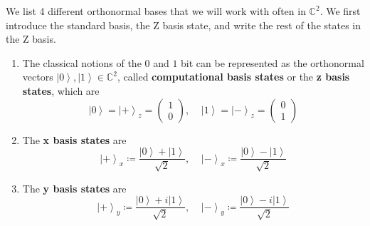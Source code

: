 \documentclass{article}
\newcommand{\ket}[1]{\ensuremath{\left|#1\right\rangle}}
\newcounter{definition}[section]
\begin{document}
    \begin{definition}
      \label{def:basis-states}
      We list 4 different orthonormal bases that we will work with often in $\mathbb{C}^2$. We first introduce the standard basis, the Z basis state, and write the rest of the states in the Z basis. 

      \begin{enumerate}
        \item The classical notions of the $0$ and $1$ bit can be represented as the orthonormal vectors $\ket{0}, \ket{1} \in \mathbb{C}^2$, called \textbf{computational basis states} or the \textbf{z basis states}, which are
          \begin{equation}
            \ket{0} = \ket{+}_z = \begin{pmatrix} 1 \\ 0 \end{pmatrix}, \;\;\;\; \ket{1} = \ket{-}_z = \begin{pmatrix} 0 \\ 1 \end{pmatrix}
          \end{equation}
            

        \item The \textbf{x basis states} are 
          \begin{equation}
            \ket{+}_x \coloneqq \frac{\ket{0} + \ket{1}}{\sqrt{2}} , \;\;\;\; \ket{-}_x \coloneqq \frac{\ket{0} - \ket{1}}{\sqrt{2}} 
            \label{eq:x_basis}
          \end{equation}
        
        \item The \textbf{y basis states} are 
          \begin{equation}
            \ket{+}_y \coloneqq \frac{\ket{0} + i \ket{1}}{\sqrt{2}} , \;\;\;\; \ket{-}_y \coloneqq \frac{\ket{0} - i \ket{1}}{\sqrt{2}} 
            \label{eq:y_basis}
          \end{equation}
      \end{enumerate}      
    \end{definition}
\end{document}
